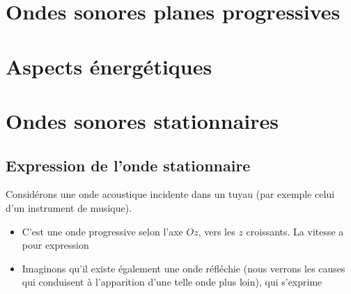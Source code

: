 \documentclass[a4paper, 12pt]{article}
\begin{document}
\newpage
\section{Ondes sonores planes progressives}

\newpage
\section{Aspects énergétiques}

\newpage
\section{Ondes sonores stationnaires}

\subsection{Expression de l'onde stationnaire}

Considérons une onde acoustique incidente dans un tuyau (par exemple celui d'un instrument de musique). 

\begin{itemize}
\item C'est une onde progressive selon l'axe $Oz$, vers les $z$ croissants. La vitesse a pour expression

\begin{center}
\end{center}

\item Imaginons qu'il existe également une onde réfléchie (nous verrons les causes qui conduisent à l'apparition d'une telle onde plus loin), qui s'exprime
\begin{center}
\end{center}
\end{itemize}

\noindent{}
\end{document}
